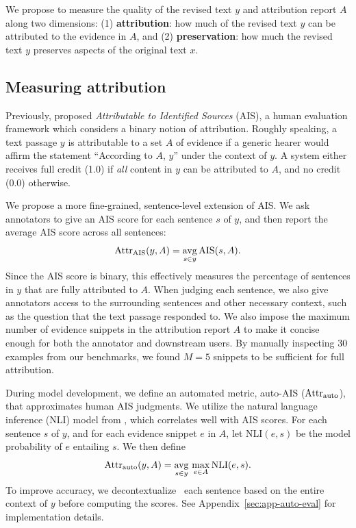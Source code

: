 \documentclass[11pt]{article}
\begin{document}
We propose to measure the quality of the revised text $y$ and attribution report $A$ along two dimensions: (1) \textbf{attribution}: how much of the revised text $y$ can be attributed to the evidence in $A$,
and (2) \textbf{preservation}: how much the revised text $y$ preserves aspects of the original text $x$.


\subsection{Measuring attribution}

Previously, \citet{Rashkin2021AIS} proposed \emph{Attributable to Identified Sources} (AIS), a human evaluation framework which considers a binary notion of attribution.
Roughly speaking, a text passage $y$ is attributable to a set $A$ of evidence if a generic hearer would affirm the statement ``According to $A$, $y$'' under the context of $y$.
A system either receives full credit (1.0) if \emph{all} content in $y$ can be attributed to $A$, and no credit (0.0) otherwise.

We propose a more fine-grained, sentence-level extension of AIS.
We ask annotators to give an AIS score for each sentence $s$ of $y$, and then report the average AIS score across all sentences:
\begin{equation}
\text{Attr}_\text{AIS}(y, A) = \operatorname*{avg}_{s \in y} \text{AIS}(s, A).
\end{equation}
Since the AIS score is binary, this effectively measures the percentage of sentences in $y$ that are fully attributed to $A$. When judging each sentence, we also give annotators access to the surrounding sentences and other necessary context, such as the question that the text passage responded to.
We also impose the maximum number of evidence snippets in the attribution report $A$
to make it concise enough for both the annotator and downstream users.
By manually inspecting 30 examples from our benchmarks,
we found $M = 5$ snippets to be sufficient for full attribution.

During model development, we define
an automated metric, auto-AIS ($\text{Attr}_\text{auto}{}$), that approximates human AIS judgments.
We utilize the natural language inference (NLI) model from \citet{Honovich2022TRUERF}, which correlates well with AIS scores.
For each sentence $s$ of $y$,
and for each evidence snippet $e$ in $A$,
let $\text{NLI}(e, s)$ be the model probability of $e$ entailing $s$. We then define
\begin{equation}
\text{Attr}_\text{auto}(y, A) = \operatorname*{avg}_{s \in y} \, \max_{e \in A} \text{NLI}(e, s).
\end{equation}
To improve accuracy, we decontextualize~\cite{choi2021making} each sentence based on the entire context of $y$ %
before computing the scores.
See Appendix~\ref{sec:app-auto-eval} for implementation details.
\end{document}
